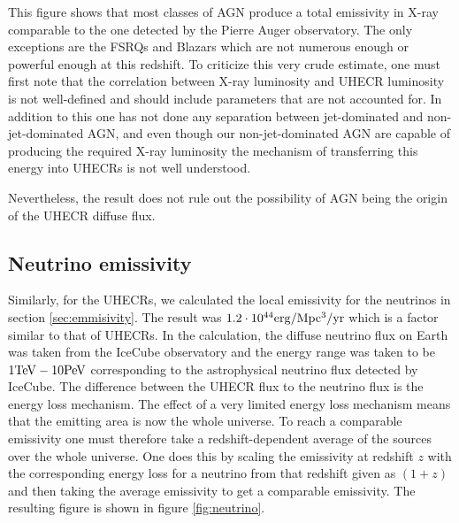 This figure shows that most classes of AGN produce a total emissivity in X-ray comparable to the one detected by the Pierre Auger observatory. The only exceptions are the FSRQs and Blazars which are not numerous enough or powerful enough at this redshift. 
To criticize this very crude estimate, one must first note that the correlation between X-ray luminosity and UHECR luminosity is not well-defined and should include parameters that are not accounted for.
In addition to this one has not done any separation between jet-dominated and non-jet-dominated AGN, and even though our non-jet-dominated AGN are capable of producing the required X-ray luminosity
the mechanism of transferring this energy into UHECRs is not well understood. 


Nevertheless, the result does not rule out the possibility of AGN being the origin of the UHECR diffuse flux. 


\subsection{Neutrino emissivity}
Similarly, for the UHECRs, we calculated the local emissivity for the neutrinos in section \ref{sec:emmisivity}. The result was $1.2 \cdot 10^{44} \rm erg/\rm Mpc^3\rm /yr$ which is a factor similar to that of UHECRs.
In the calculation, the diffuse neutrino flux on Earth was taken from the IceCube observatory \cite{Abbasi_2022} and the energy range was taken to be $1\rm TeV - 10\rm PeV$ corresponding to the astrophysical neutrino flux detected by IceCube.
The difference between the UHECR flux to the neutrino flux is the energy loss mechanism. The effect of a very limited energy loss mechanism means that the emitting area is now the whole universe. To reach a comparable emissivity one must therefore take a redshift-dependent average of the sources over the whole universe.
One does this by scaling the emissivity at redshift $z$ with the corresponding energy loss for a neutrino from that redshift given as $(1+z)$ and then taking the average emissivity to get a comparable emissivity.
The resulting figure is shown in figure \ref{fig:neutrino}.

